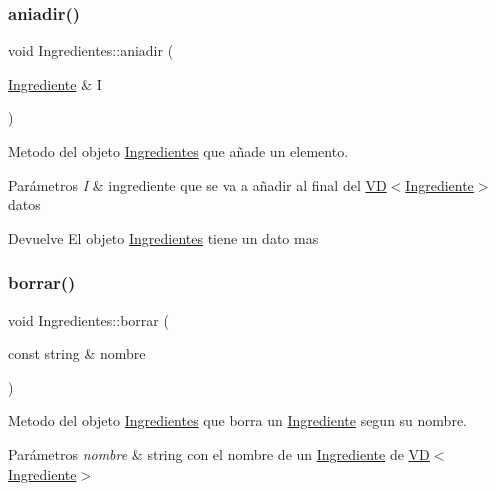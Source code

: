 \subsubsection{\texorpdfstring{aniadir()}{aniadir()}}
{\footnotesize\ttfamily void Ingredientes\+::aniadir (\begin{DoxyParamCaption}\item[{\hyperlink{classIngrediente}{Ingrediente} \&}]{I }\end{DoxyParamCaption})}



Metodo del objeto \hyperlink{classIngredientes}{Ingredientes} que añade un elemento. 


\begin{DoxyParams}{Parámetros}
{\em I} & ingrediente que se va a añadir al final del \hyperlink{classVD}{V\+D$<$\+Ingrediente$>$} datos \\
\hline
\end{DoxyParams}
\begin{DoxyReturn}{Devuelve}
El objeto \hyperlink{classIngredientes}{Ingredientes} tiene un dato mas 
\end{DoxyReturn}
\mbox{\label{classIngredientes_af3fa6c08d9fea867c2f4dd3efad4223c}} 
\subsubsection{\texorpdfstring{borrar()}{borrar()}}
{\footnotesize\ttfamily void Ingredientes\+::borrar (\begin{DoxyParamCaption}\item[{const string \&}]{nombre }\end{DoxyParamCaption})}



Metodo del objeto \hyperlink{classIngredientes}{Ingredientes} que borra un \hyperlink{classIngrediente}{Ingrediente} segun su nombre. 


\begin{DoxyParams}{Parámetros}
{\em nombre} & string con el nombre de un \hyperlink{classIngrediente}{Ingrediente} de \hyperlink{classVD}{V\+D$<$\+Ingrediente$>$} \\
\hline
\end{DoxyParams}
\mbox{\label{classIngredientes_a8d2f13225611193fe2a03b5a8d74cab7}} 
